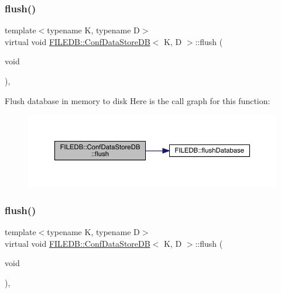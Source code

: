 \subsubsection{\texorpdfstring{flush()}{flush()}\hspace{0.1cm}{\footnotesize\ttfamily [1/2]}}
{\footnotesize\ttfamily template$<$typename K, typename D$>$ \\
virtual void \mbox{\hyperlink{classFILEDB_1_1ConfDataStoreDB}{F\+I\+L\+E\+D\+B\+::\+Conf\+Data\+Store\+DB}}$<$ K, D $>$\+::flush (\begin{DoxyParamCaption}\item[{void}]{ }\end{DoxyParamCaption})\hspace{0.3cm}{\ttfamily [inline]}, {\ttfamily [virtual]}}

Flush database in memory to disk Here is the call graph for this function\+:
\nopagebreak
\begin{figure}[H]
\begin{center}
\leavevmode
\includegraphics[width=350pt]{d8/d19/classFILEDB_1_1ConfDataStoreDB_a982ae3b2108acbf75ab15a939fc7871b_cgraph}
\end{center}
\end{figure}
\mbox{\label{classFILEDB_1_1ConfDataStoreDB_a982ae3b2108acbf75ab15a939fc7871b}} 
\subsubsection{\texorpdfstring{flush()}{flush()}\hspace{0.1cm}{\footnotesize\ttfamily [2/2]}}
{\footnotesize\ttfamily template$<$typename K, typename D$>$ \\
virtual void \mbox{\hyperlink{classFILEDB_1_1ConfDataStoreDB}{F\+I\+L\+E\+D\+B\+::\+Conf\+Data\+Store\+DB}}$<$ K, D $>$\+::flush (\begin{DoxyParamCaption}\item[{void}]{ }\end{DoxyParamCaption})\hspace{0.3cm}{\ttfamily [inline]}, {\ttfamily [virtual]}}

